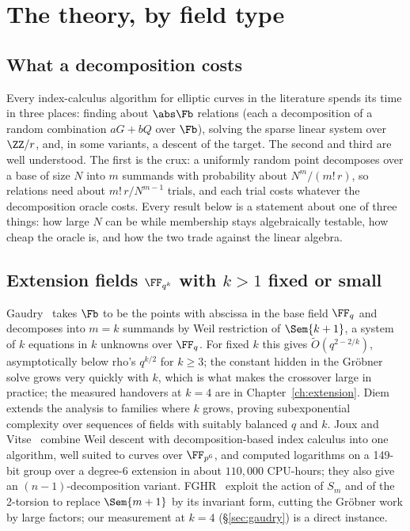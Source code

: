 \chapter{The theory, by field type}\label{sec:theory}


\section{What a decomposition costs}

Every index-calculus algorithm for elliptic curves in the literature
spends its time in three places: finding about $\abs\Fb$ relations (each
a decomposition of a random combination $aG+bQ$ over $\Fb$), solving the
sparse linear system over $\ZZ/r$, and, in some variants, a descent of
the target. The second and third are well understood. The first is the
crux: a uniformly random point decomposes over a base of size $N$ into $m$
summands with probability about $N^m/(m!\,r)$, so relations need about
$m!\,r/N^{m-1}$ trials, and each trial costs whatever the decomposition
oracle costs. Every result below is a statement about one of three things:
how large $N$ can be while membership stays algebraically testable, how
cheap the oracle is, and how the two trade against the linear algebra.

\section{Extension fields $\FF_{q^k}$ with $k>1$ fixed or small}

Gaudry~\cite{gaudry2009} takes $\Fb$ to be the points with abscissa in the
base field $\FF_q$ and decomposes into $m=k$ summands by Weil restriction of
$\Sem{k+1}$, a system of $k$ equations in $k$ unknowns over $\FF_q$. For
fixed $k$ this gives $\tilde O(q^{2-2/k})$, asymptotically below rho's
$q^{k/2}$ for $k\ge3$; the constant hidden in the Gr\"obner solve grows
very quickly with $k$, which is what makes the crossover large in
practice; the measured handovers at $k=4$ are in Chapter~\ref{ch:extension}.
Diem~\cite{diem2011} extends the analysis to families where $k$ grows,
proving subexponential complexity over sequences of fields with suitably
balanced $q$ and $k$. Joux and Vitse~\cite{jouxvitse2012} combine Weil
descent with decomposition-based index calculus into one algorithm, well
suited to curves over $\FF_{p^6}$, and computed logarithms on a 149-bit
group over a degree-6 extension in about $110{,}000$ CPU-hours; they also
give an $(n-1)$-decomposition variant. FGHR~\cite{fghr2014} exploit the action of $S_m$ and of
the 2-torsion to replace $\Sem{m+1}$ by its invariant form, cutting the
Gr\"obner work by large factors; our measurement at $k=4$
(\S\ref{sec:gaudry}) is a direct instance.

